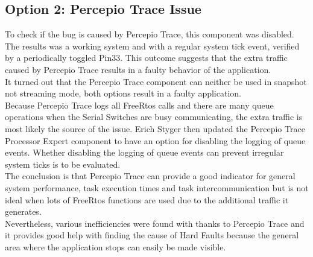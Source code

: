 \subsection{Option 2: Percepio Trace Issue}
%
%
To check if the bug is caused by Percepio Trace, this component was disabled. The results was a working system and with a regular system tick event, verified by a periodically toggled Pin33. This outcome suggests that the extra traffic caused by Percepio Trace results in a faulty behavior of the application.\\
It turned out that the Percepio Trace component can neither be used in snapshot not streaming mode, both options result in a faulty application.\\
Because Percepio Trace logs all FreeRtos calls and there are many queue operations when the Serial Switches are busy communicating, the extra traffic is most likely the source of the issue. Erich Styger then updated the Percepio Trace Processor Expert component to have an option for disabling the logging of queue events. Whether disabling the logging of queue events can prevent irregular system ticks is to be evaluated.\\
The conclusion is that Percepio Trace can provide a good indicator for general system performance, task execution times and task intercommunication but is not ideal when lots of FreeRtos functions are used due to the additional traffic it generates.\\
Nevertheless, various inefficiencies were found with thanks to Percepio Trace and it provides good help with finding the cause of Hard Faults because the general area where the application stops can easily be made visible.
%
%
%
